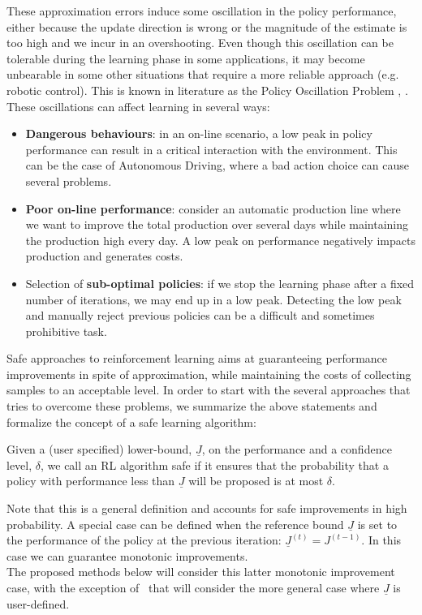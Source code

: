 These approximation errors induce some oscillation in the policy performance, either because the update direction is wrong or the magnitude of the estimate is too high and we incur in an overshooting. Even though this oscillation can be tolerable during the learning phase in some applications, it may become unbearable in some other situations that require a more reliable approach (e.g. robotic control). This is known in literature as the Policy Oscillation Problem \cite{Bertsekas2011}, \cite{NIPS2011_4274}. These oscillations can affect learning in several ways:
\begin{itemize}
\item \textbf{Dangerous behaviours}: in an on-line scenario, a low peak in policy performance can result in a critical interaction with the environment. This can be the case of Autonomous Driving, where a bad action choice can cause several problems.
\item \textbf{Poor on-line performance}: consider an automatic production line where we want to improve the total production over several days while maintaining the production high every day. A low peak on performance negatively impacts production and generates costs.
\item Selection of \textbf{sub-optimal policies}: if we stop the learning phase after a fixed number of iterations, we may end up in a low peak. Detecting the low peak and manually reject previous policies can be a difficult and sometimes prohibitive task.
\end{itemize}

Safe approaches to reinforcement learning aims at guaranteeing performance improvements in spite of approximation, while maintaining the costs of collecting samples to an acceptable level.
In order to start with the several approaches that tries to overcome these problems, we summarize the above statements and formalize the concept of a safe learning algorithm:
\begin{definition}
\label{def:safety}
Given a (user specified) lower-bound, $\underline{J}$, on the performance and a confidence level, $\delta$, we call an RL algorithm safe if it ensures that the probability that a policy with performance less than $\underline{J}$ will be proposed is at most $\delta$.
\end{definition}

Note that this is a general definition and accounts for safe improvements in high probability. A special case can be defined when the reference bound $\underline{J}$ is set to the performance of the policy at the previous iteration: $\underline{J}^{(t)} = J^{(t-1)}$. In this case we can guarantee monotonic improvements.\\
The proposed methods below will consider this latter monotonic improvement case, with the exception of~ that will consider the more general case where $\underline{J}$ is user-defined.

